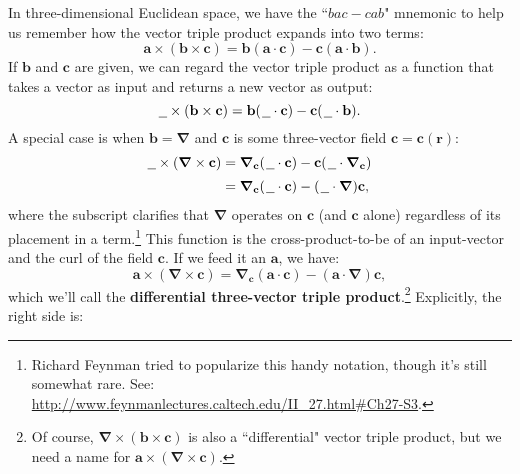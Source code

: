 \documentclass[12pt]{article}
\renewcommand{\vv}[1]{\mathbf{#1}}
\newcommand{\del}{\boldsymbol{\nabla}}
\begin{document}
In three-dimensional Euclidean space, we have the ``$bac - cab$" mnemonic to help us remember how the vector triple product expands into two terms:
\begin{equation*}
\vv a \times (\vv b \times \vv c) = \vv b (\vv a \cdot \vv c) - \vv c (\vv a \cdot \vv b).
\end{equation*}
If $\vv b$ and $\vv c$ are given, we can regard the vector triple product as a function that takes a vector as input and returns a new vector as output:
\begin{equation*}
\text{\underline{\hspace{.6em}}} \times (\vv b \times \vv c) = \vv b ( \mkern1.5mu \text{\underline{\hspace{.6em}}} \cdot \vv c ) - \vv c ( \mkern1.5mu \text{\underline{\hspace{.6em}}} \cdot \vv b ).
\end{equation*}
A special case is when $\vv b = \del$ and $\vv c$ is some three-vector field $\vv c = \vv c (\vv r)$:
\begin{equation}\label{eq:cc}
\begin{split}
\text{\underline{\hspace{.6em}}} \times (\del \times \vv c) &= \del_{\vv c} ( \mkern1.5mu \text{\underline{\hspace{.6em}}} \cdot \vv c ) - \vv c ( \mkern1.5mu \text{\underline{\hspace{.6em}}} \cdot \del_{\vv c} ) \\[2pt]
&= \del_{\vv c} ( \mkern1.5mu \text{\underline{\hspace{.6em}}} \cdot \vv c ) - ( \mkern1.5mu \text{\underline{\hspace{.6em}}} \cdot \del ) \vv c ,
\end{split}
\end{equation}
where the subscript clarifies that $\del$ operates on $\vv c$ (and $\vv c$ alone) regardless of its placement in a term.\footnote{Richard Feynman tried to popularize this handy notation, though it's still somewhat rare. See: \url{http://www.feynmanlectures.caltech.edu/II_27.html\#Ch27-S3}.} This function is the cross-product-to-be of an input-vector and the curl of the field $\vv c$. If we feed it an $\vv a$, we have:
\begin{equation*}
\vv a \times (\del \times \vv c) = \del_{\vv c} ( \vv a \cdot \vv c ) - ( \vv a \cdot \del ) \vv c ,
\end{equation*}
which we'll call the \textbf{differential three-vector triple product}.\footnote{Of course, $\del \times (\vv b \times \vv c)$ is also a ``differential" vector triple product, but we need a name for $\vv a \times (\del \times \vv c)$.} Explicitly, the right side is:
\end{document}
